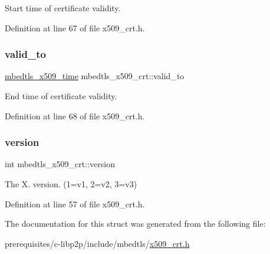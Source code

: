 Start time of certificate validity. 

Definition at line 67 of file x509\+\_\+crt.\+h.

\mbox{\label{structmbedtls__x509__crt_a05af94003d5948703ca537b6a5f2d5b4}} 
\subsubsection{\texorpdfstring{valid\+\_\+to}{valid\_to}}
{\footnotesize\ttfamily \mbox{\hyperlink{structmbedtls__x509__time}{mbedtls\+\_\+x509\+\_\+time}} mbedtls\+\_\+x509\+\_\+crt\+::valid\+\_\+to}

End time of certificate validity. 

Definition at line 68 of file x509\+\_\+crt.\+h.

\mbox{\label{structmbedtls__x509__crt_a879ea07a05ab857c0f5793572bf1696e}} 
\subsubsection{\texorpdfstring{version}{version}}
{\footnotesize\ttfamily int mbedtls\+\_\+x509\+\_\+crt\+::version}

The X. version. (1=v1, 2=v2, 3=v3) 

Definition at line 57 of file x509\+\_\+crt.\+h.



The documentation for this struct was generated from the following file\+:\begin{DoxyCompactItemize}
\item 
prerequisites/c-\/libp2p/include/mbedtls/\mbox{\hyperlink{x509__crt_8h}{x509\+\_\+crt.\+h}}\end{DoxyCompactItemize}
